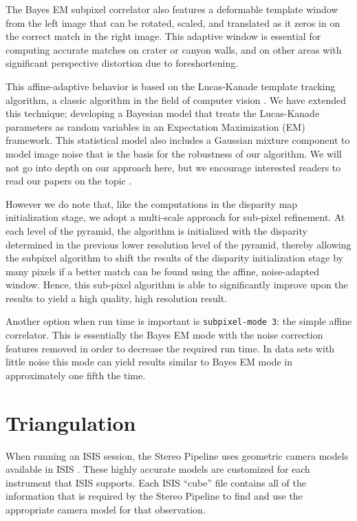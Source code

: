 The Bayes EM subpixel correlator also features a deformable template
window from the left image that can be rotated, scaled, and translated
as it zeros in on the correct match in the right image.  This
adaptive window is essential for computing accurate matches on crater
or canyon walls, and on other areas with significant perspective
distortion due to foreshortening.

This affine-adaptive behavior is based on the Lucas-Kanade template
tracking algorithm, a classic algorithm in the field of computer
vision \citep{Baker04:lucas-kanade}.  We have extended this technique;
developing a Bayesian model that treats the Lucas-Kanade parameters
as random variables in an Expectation Maximization (EM) framework.
This statistical model also includes a Gaussian mixture component
to model image noise that is the basis for the robustness of our
algorithm.  We will not go into depth on our approach here, but we
encourage interested readers to read our papers on the topic
\citep{nefian:bayes_em, broxton:isvc09}.

However we do note that, like the computations in the disparity map
initialization stage, we adopt a multi-scale approach for sub-pixel
refinement. At each level of the pyramid, the algorithm is initialized
with the disparity determined in the previous lower resolution level
of the pyramid, thereby allowing the subpixel algorithm to shift the
results of the disparity initialization stage by many pixels if a better
match can be found using the affine, noise-adapted window.  Hence,
this sub-pixel algorithm is able to significantly improve upon the
results to yield a high quality, high resolution result.

Another option when run time is important is \texttt{subpixel-mode 3}:
the simple affine correlator.  This is essentially the Bayes EM mode
with the noise correction features removed in order to decrease the
required run time.  In data sets with little noise this mode can yield
results similar to Bayes EM mode in approximately one fifth the time.

\section{Triangulation}

When running an ISIS session, the Stereo Pipeline uses geometric
camera models available in \ac{ISIS} \citep{anderson08:isis}.  These
highly accurate models are customized for each instrument that
\ac{ISIS} supports.  Each \ac{ISIS} ``cube'' file contains all of the
information that is required by the Stereo Pipeline to find and use
the appropriate camera model for that observation.

